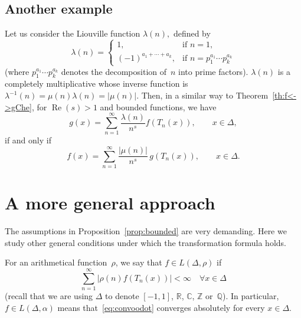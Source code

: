 \documentclass[10pt,a4paper]{amsart}
\theoremstyle{plain}
\theoremstyle{remark}
\renewcommand{\Re}{\operatorname{Re}}
\newcommand{\Q}{\mathbb{Q}}
\newcommand{\R}{\mathbb{R}}
\newcommand{\C}{\mathbb{C}}
\newcommand{\Z}{\mathbb{Z}}
\begin{document}
\subsection*{Another example}

Let us consider the Liouville function $\lambda(n),$ defined by
\begin{equation*}
  \lambda(n) =
  \begin{cases}
    1, & \mbox{if } n=1,\\
    (-1)^{a_1+\cdots+a_k}, & \mbox{if } n = p_1^{a_1}\cdots p_k^{a_k}
  \end{cases}
\end{equation*}
(where $p_1^{a_1}\cdots p_k^{a_k}$ denotes the decomposition of~$n$
into prime factors). $\lambda(n)$ is a completely multiplicative whose
inverse function is $\lambda^{-1}(n) = \mu(n)\lambda(n) = |\mu(n)|$.
Then, in a similar way to Theorem~\ref{th:f<->gChe}, for $\Re(s)>1$ and bounded
functions, we have
\begin{equation*}
  g(x) = \sum_{n=1}^\infty \frac{\lambda(n)}{n^s} f(T_n(x)), \qquad x \in \Delta,
\end{equation*}
if and only if
\begin{equation*}
  f(x) = \sum_{n=1}^\infty \frac{|\mu(n)|}{n^s} \, g(T_n(x)), \qquad x \in \Delta.
\end{equation*}


\section{A more general approach}
\label{sec:general}

The assumptions in Proposition~\ref{prop:bounded} are very demanding.
Here we study other general conditions under which the transformation
formula holds.

For an arithmetical function~$\rho$, we say that $f \in L(\Delta,\rho)$ if
\begin{equation*}
  \sum_{n=1}^\infty |\rho(n) f(T_n(x))| < \infty
  \quad \forall x \in \Delta
\end{equation*}
(recall that we are using $\Delta$ to denote $[-1,1]$, $\R$, $\C$, $\Z$ or~$\Q$).
In particular, $f \in L(\Delta,\alpha)$ means that~\eqref{eq:convoodot}
converges absolutely for every $x \in \Delta$.
\end{document}
